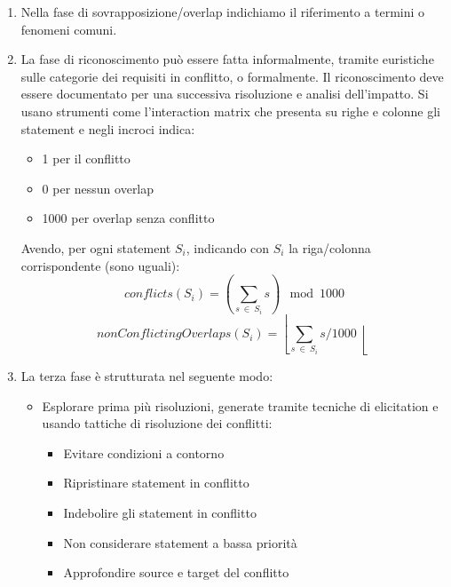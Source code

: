 \begin{enumerate}
    \item Nella fase di sovrapposizione/overlap indichiamo il riferimento a
          termini o fenomeni comuni.
    \item La fase di riconoscimento può essere fatta informalmente, tramite
          euristiche sulle categorie dei requisiti in conflitto, o formalmente. Il
          riconoscimento deve essere documentato per una successiva risoluzione e analisi
          dell'impatto. Si usano strumenti come l'interaction matrix che presenta su
          righe e colonne gli statement e negli incroci indica:
          \begin{itemize}
              \item 1 per il conflitto
              \item 0 per nessun overlap
              \item 1000 per overlap senza conflitto
          \end{itemize}
          Avendo, per ogni statement $S_i$, indicando con $S_i$ la riga/colonna
          corrispondente (sono uguali):
          \begin{equation}
              conflicts(S_i) = \left(\sum_{s \ \in \ S_i} s \right) \mod 1000
          \end{equation}
          \begin{equation}
              nonConflictingOverlaps(S_i) = \left\lfloor \sum_{s \ \in \ S_i} s / 1000 \right\lfloor
          \end{equation}
    \item La terza fase è strutturata nel seguente modo:
          \begin{itemize}
              \item Esplorare prima più risoluzioni, generate tramite tecniche
                    di elicitation e usando tattiche di risoluzione dei conflitti:
                    \begin{itemize}
                        \item Evitare condizioni a contorno
                        \item Ripristinare statement in conflitto
                        \item Indebolire gli statement in conflitto
                        \item Non considerare statement a bassa priorità
                        \item Approfondire source e target del conflitto
                    \end{itemize}

\end{itemize}
\end{enumerate}
